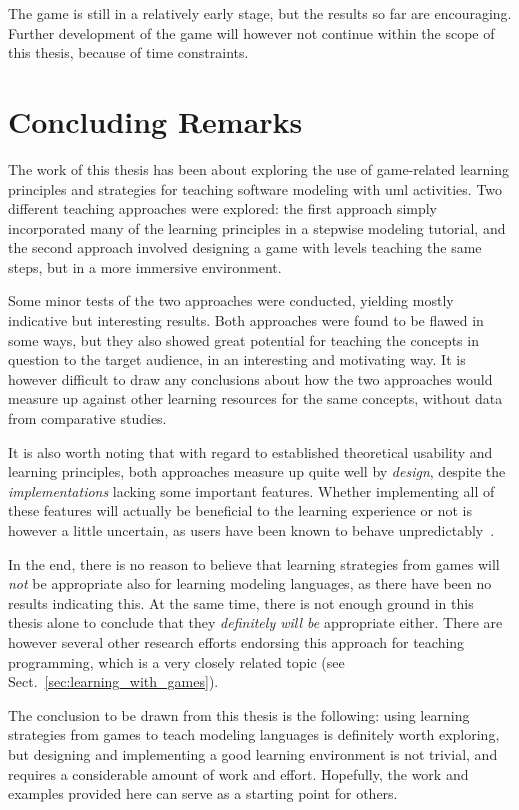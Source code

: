 \noindent
The game is still in a relatively early stage, but the results so far are encouraging. Further development of the game will however not continue within the scope of this thesis, because of time constraints.


\section{Concluding Remarks}
\label{sec:concluding_remarks}
The work of this thesis has been about exploring the use of game-related learning principles and strategies for teaching software modeling with \gls{uml} activities. Two different teaching approaches were explored:  the first approach simply incorporated many of the learning principles in a stepwise modeling tutorial, and the second approach involved designing a game with levels teaching the same steps, but in a more immersive environment.

\noindent
Some minor tests of the two approaches were conducted, yielding mostly indicative but interesting results. Both approaches were found to be flawed in some ways, but they also showed great potential for teaching the concepts in question to the target audience, in an interesting and motivating way. It is however difficult to draw any conclusions about how the two approaches would measure up against other learning resources for the same concepts, without data from comparative studies.

\noindent
It is also worth noting that with regard to established theoretical usability and learning principles, both approaches measure up quite well by \emph{design}, despite the \emph{implementations} lacking some important features. Whether implementing all of these features will actually be beneficial to the learning experience or not is however a little uncertain, as users have been known to behave unpredictably~\cite{andersen:tutorials_impact}.

\noindent
In the end, there is no reason to believe that learning strategies from games will \emph{not} be appropriate also for learning modeling languages, as there have been no results indicating this. At the same time, there is not enough ground in this thesis alone to conclude that they \emph{definitely will be} appropriate either. There are however several other research efforts endorsing this approach for teaching programming, which is a very closely related topic (see Sect.~\ref{sec:learning_with_games}).

\noindent
The conclusion to be drawn from this thesis is the following: using learning strategies from games to teach modeling languages is definitely worth exploring, but designing and implementing a good learning environment is not trivial, and requires a considerable amount of work and effort. Hopefully, the work and examples provided here can serve as a starting point for others.

